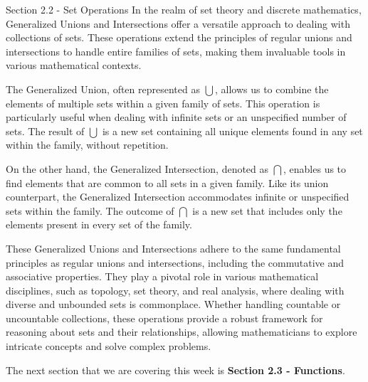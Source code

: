 \begin{notes}{Section 2.2 - Set Operations}
    In the realm of set theory and discrete mathematics, Generalized Unions and Intersections offer a versatile approach to dealing with collections of sets. These operations extend the principles of 
    regular unions and intersections to handle entire families of sets, making them invaluable tools in various mathematical contexts.

    The Generalized Union, often represented as $\bigcup$, allows us to combine the elements of multiple sets within a given family of sets. This operation is particularly useful when dealing with 
    infinite sets or an unspecified number of sets. The result of $\bigcup$ is a new set containing all unique elements found in any set within the family, without repetition.

    On the other hand, the Generalized Intersection, denoted as $\bigcap$, enables us to find elements that are common to all sets in a given family. Like its union counterpart, the Generalized Intersection 
    accommodates infinite or unspecified sets within the family. The outcome of $\bigcap$ is a new set that includes only the elements present in every set of the family.

    These Generalized Unions and Intersections adhere to the same fundamental principles as regular unions and intersections, including the commutative and associative properties. They play a pivotal role 
    in various mathematical disciplines, such as topology, set theory, and real analysis, where dealing with diverse and unbounded sets is commonplace. Whether handling countable or uncountable collections, 
    these operations provide a robust framework for reasoning about sets and their relationships, allowing mathematicians to explore intricate concepts and solve complex problems.
\end{notes}

The next section that we are covering this week is \textbf{Section 2.3 - Functions}.

